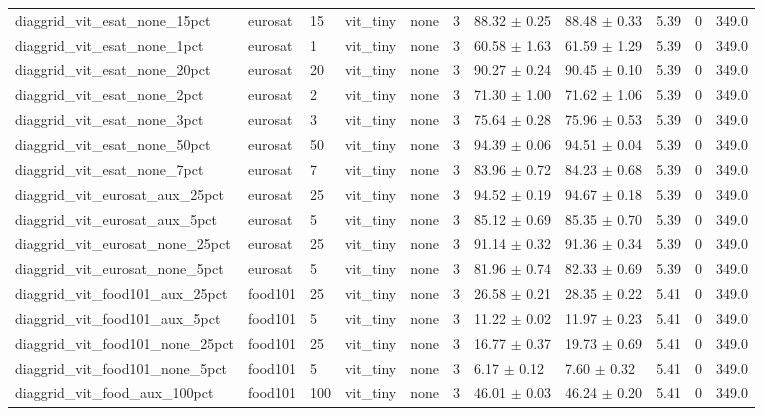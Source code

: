 \begin{tabular}{lllllllllll}
diaggrid_vit_esat_none_15pct & eurosat & 15 & vit_tiny & none & 3 & 88.32 $\pm$ 0.25 & 88.48 $\pm$ 0.33 & 5.39 & 0 & 349.0 \\
diaggrid_vit_esat_none_1pct & eurosat & 1 & vit_tiny & none & 3 & 60.58 $\pm$ 1.63 & 61.59 $\pm$ 1.29 & 5.39 & 0 & 349.0 \\
diaggrid_vit_esat_none_20pct & eurosat & 20 & vit_tiny & none & 3 & 90.27 $\pm$ 0.24 & 90.45 $\pm$ 0.10 & 5.39 & 0 & 349.0 \\
diaggrid_vit_esat_none_2pct & eurosat & 2 & vit_tiny & none & 3 & 71.30 $\pm$ 1.00 & 71.62 $\pm$ 1.06 & 5.39 & 0 & 349.0 \\
diaggrid_vit_esat_none_3pct & eurosat & 3 & vit_tiny & none & 3 & 75.64 $\pm$ 0.28 & 75.96 $\pm$ 0.53 & 5.39 & 0 & 349.0 \\
diaggrid_vit_esat_none_50pct & eurosat & 50 & vit_tiny & none & 3 & 94.39 $\pm$ 0.06 & 94.51 $\pm$ 0.04 & 5.39 & 0 & 349.0 \\
diaggrid_vit_esat_none_7pct & eurosat & 7 & vit_tiny & none & 3 & 83.96 $\pm$ 0.72 & 84.23 $\pm$ 0.68 & 5.39 & 0 & 349.0 \\
diaggrid_vit_eurosat_aux_25pct & eurosat & 25 & vit_tiny & none & 3 & 94.52 $\pm$ 0.19 & 94.67 $\pm$ 0.18 & 5.39 & 0 & 349.0 \\
diaggrid_vit_eurosat_aux_5pct & eurosat & 5 & vit_tiny & none & 3 & 85.12 $\pm$ 0.69 & 85.35 $\pm$ 0.70 & 5.39 & 0 & 349.0 \\
diaggrid_vit_eurosat_none_25pct & eurosat & 25 & vit_tiny & none & 3 & 91.14 $\pm$ 0.32 & 91.36 $\pm$ 0.34 & 5.39 & 0 & 349.0 \\
diaggrid_vit_eurosat_none_5pct & eurosat & 5 & vit_tiny & none & 3 & 81.96 $\pm$ 0.74 & 82.33 $\pm$ 0.69 & 5.39 & 0 & 349.0 \\
diaggrid_vit_food101_aux_25pct & food101 & 25 & vit_tiny & none & 3 & 26.58 $\pm$ 0.21 & 28.35 $\pm$ 0.22 & 5.41 & 0 & 349.0 \\
diaggrid_vit_food101_aux_5pct & food101 & 5 & vit_tiny & none & 3 & 11.22 $\pm$ 0.02 & 11.97 $\pm$ 0.23 & 5.41 & 0 & 349.0 \\
diaggrid_vit_food101_none_25pct & food101 & 25 & vit_tiny & none & 3 & 16.77 $\pm$ 0.37 & 19.73 $\pm$ 0.69 & 5.41 & 0 & 349.0 \\
diaggrid_vit_food101_none_5pct & food101 & 5 & vit_tiny & none & 3 & 6.17 $\pm$ 0.12 & 7.60 $\pm$ 0.32 & 5.41 & 0 & 349.0 \\
diaggrid_vit_food_aux_100pct & food101 & 100 & vit_tiny & none & 3 & 46.01 $\pm$ 0.03 & 46.24 $\pm$ 0.20 & 5.41 & 0 & 349.0 \\

\end{tabular}
